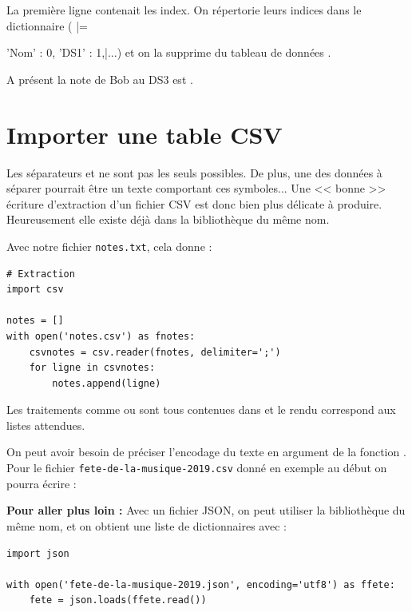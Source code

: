 La première ligne contenait les index. On répertorie leurs indices dans le dictionnaire  ( \pythoninline|= {'Nom' : 0, 'DS1' : 1,|...) et on la supprime du tableau de données .

A présent la note de Bob au DS3 est .

\section{Importer une table CSV}

Les séparateurs  et  ne sont pas les seuls possibles. De plus, une des données à séparer pourrait être un texte comportant ces symboles... Une << bonne >> écriture d'extraction d'un fichier CSV est donc bien plus délicate à produire. Heureusement elle existe déjà dans la bibliothèque du même nom.

\medskip

Avec notre fichier \texttt{notes.txt}, cela donne :

\begin{verbatim}
# Extraction
import csv

notes = []
with open('notes.csv') as fnotes:
    csvnotes = csv.reader(fnotes, delimiter=';')
    for ligne in csvnotes:
        notes.append(ligne)
\end{verbatim}

Les traitements comme   ou
 sont tous contenues dans  et le rendu correspond aux listes attendues. 

\medskip


On peut avoir besoin de préciser l'encodage du texte en argument de la fonction . Pour le fichier \texttt{fete-de-la-musique-2019.csv} donné en exemple au début on pourra écrire :

\medskip

{\bfseries Pour aller plus loin :}
Avec un fichier JSON, on peut utiliser la bibliothèque du même nom, et on obtient une liste de dictionnaires avec :

\vspace{-2ex}
\begin{verbatim}
import json

with open('fete-de-la-musique-2019.json', encoding='utf8') as ffete:
    fete = json.loads(ffete.read())
\end{verbatim}

}

